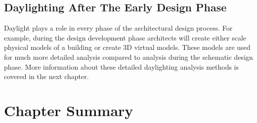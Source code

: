 
\subsection{Daylighting After The Early Design Phase}
Daylight plays a role in every phase of the architectural design process.
For example, during the design development phase architects will create either scale physical models of a building or create 3D virtual models.
These models are used for much more detailed analysis compared to analysis during the schematic design phase.
More information about these detailed daylighting analysis methods is covered in the next chapter.\\


\section{Chapter Summary}

